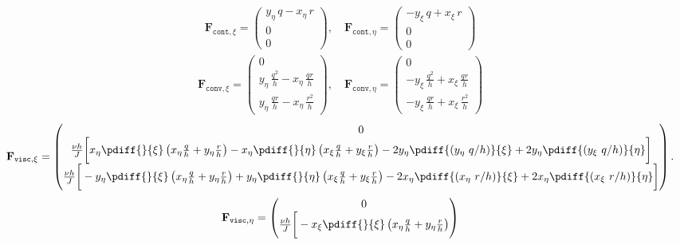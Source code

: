 {{\begin{align}
		\mathbf{F}_{\texttt{cont},\xi}=
		\begin{pmatrix}
			y_{\eta}\, q - x_{\eta}\, r\\
			0\\
			0
		\end{pmatrix},
		\quad
		\mathbf{F}_{\texttt{cont},\eta}=
		\begin{pmatrix}
			-y_{\xi}\, q + x_{\xi}\, r\\
			0 \\
			0
		\end{pmatrix}
	\end{align}
	\begin{align}
		\mathbf{F}_{\texttt{conv},\xi}=
		\begin{pmatrix}
			0\\
			y_{\eta}\, \frac{q^2}{h} - x_{\eta}\, \frac{q r}{h}\\
			y_{\eta}\, \frac{q r}{h} - x_{\eta}\, \frac{r^2}{h}
		\end{pmatrix},
		\quad
		\mathbf{F}_{\texttt{conv},\eta}=
		\begin{pmatrix}
			0\\
			-y_{\xi}\, \frac{q^2}{h} + x_{\xi}\, \frac{q r}{h}
			\\
			-y_{\xi}\, \frac{q r}{h} + x_{\xi}\, \frac{r^2}{h}
		\end{pmatrix}
	\end{align}
	\begin{align}
		\mathbf{F}_{\texttt{visc},\xi}=
		\begin{pmatrix}
			0 \\
			\frac{\nu h}{J} \bigg[
			x_{\eta} \pdiff{}{\xi}\left( x_{\eta}\frac{q}{h} + y_{\eta}\frac{r}{h}  \right)
			- x_{\eta} \pdiff{}{\eta}\left( x_{\xi} \frac{q}{h} + y_{\xi} \frac{r}{h}  \right)
			- 2 y_{\eta}  \pdiff{(y_{\eta}\ q/h)}{\xi}
			+ 2 y_{\eta}  \pdiff{(y_{\xi}\ q/h)}{\eta}\bigg]\\
			\frac{\nu h}{J} \bigg[
			-y_{\eta} \pdiff{}{\xi} \left(
			x_{\eta} \frac{q}{h}+ y_{\eta} \frac{r}{h} \right)
			+ y_{\eta} \pdiff{}{\eta} \left(
			x_{\xi} \frac{q}{h} + y_{\xi} \frac{r}{h}  \right)
			- 2 x_{\eta} \pdiff{(x_{\eta}\ r/h)}{\xi}
			+ 2 x_{\eta}  \pdiff{(x_{\xi}\ r/h)}{\eta} \bigg]
		\end{pmatrix}.
	\end{align}
	\begin{align}
		\mathbf{F}_{\texttt{visc},\eta}=
		\begin{pmatrix}
			0 \\
			\frac{\nu h}{J} \bigg[
			- x_{\xi} \pdiff{}{\xi}\left( x_{\eta}\frac{q}{h} + y_{\eta}\frac{r}{h}  \right)

\end{pmatrix}
\end{align}}}
